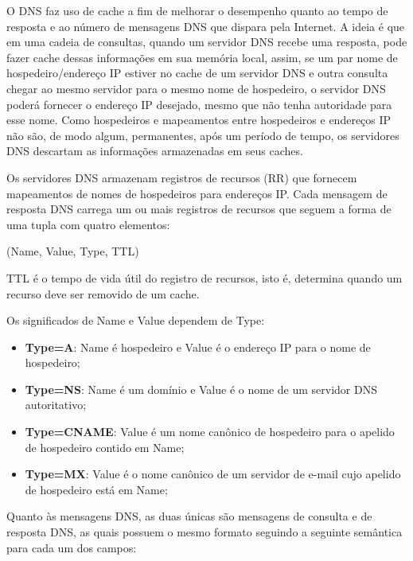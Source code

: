O DNS faz uso de cache a fim de melhorar o desempenho quanto ao tempo de resposta e ao número de mensagens DNS que dispara pela Internet. A ideia é que em uma cadeia de consultas, quando um servidor DNS recebe uma resposta, pode fazer cache dessas informações em sua memória local, assim, se um par nome de hospedeiro/endereço IP estiver no cache de um servidor DNS e outra consulta chegar ao mesmo servidor para o mesmo nome de hospedeiro, o servidor DNS poderá fornecer o endereço IP desejado, mesmo que não tenha autoridade para esse nome. Como hospedeiros e mapeamentos entre hospedeiros e endereços IP não são, de modo algum, permanentes, após um período de tempo, os servidores DNS descartam as informações armazenadas em seus caches.

Os servidores DNS armazenam registros de recursos (RR) que fornecem mapeamentos de nomes de hospedeiros para endereços IP. Cada mensagem de resposta DNS carrega um ou mais registros de recursos que seguem a forma de uma tupla com quatro elementos:
\begin{center}
    (Name, Value, Type, TTL)
\end{center}

TTL é o tempo de vida útil do registro de recursos, isto é, determina quando um recurso deve ser removido de um cache.

Os significados de Name e Value dependem de Type:
\begin{itemize}
    \item \textbf{Type=A}: Name é hospedeiro e Value é o endereço IP para o nome de hospedeiro;
    \item \textbf{Type=NS}: Name é um domínio e Value é o nome de um servidor DNS autoritativo;
    \item \textbf{Type=CNAME}: Value é um nome canônico de hospedeiro para o apelido de hospedeiro contido em Name;
    \item \textbf{Type=MX}: Value é o nome canônico de um servidor de e-mail cujo apelido de hospedeiro está em Name;
\end{itemize}

Quanto às mensagens DNS, as duas únicas são mensagens de consulta e de resposta DNS, as quais possuem o mesmo formato seguindo a seguinte semântica para cada um dos campos:

